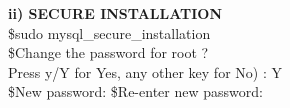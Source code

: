 \documentclass{article}
\begin{document}
\begin{flushleft}
\vspace{0.25in}
\textbf{{\normalsize ii) SECURE INSTALLATION}}\\
\vspace{0.1in}
\hspace{0.6in} \$sudo mysql\_secure\_installation \\
\vspace{5pt}
\hspace{0.6in} \$Change the password for root ?\\ \vspace{0.1in}\hspace{0.7in}Press y/Y for Yes, any other key for No) : Y\\
\vspace{0.1in}\hspace{0.55in}\$New password: 
\hspace{0.6in}\$Re-enter new password:\\




\end{flushleft}
\newpage
\textbf{ }
\newpage
\end{document}
